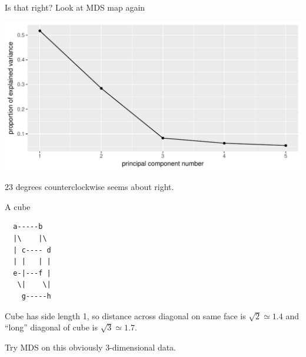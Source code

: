 \begin{frame}[fragile]{Is that right? Look at MDS map again}
  
\begin{knitrout}
\color{fgcolor}\begin{kframe}
\begin{alltt}
\end{alltt}
\end{kframe}
\includegraphics[width=\maxwidth]{figure/unnamed-chunk-25-1} 

\end{knitrout}

23 degrees counterclockwise seems about right.
  
\end{frame}

\begin{frame}[fragile]{A cube}
  
  
\begin{verbatim}
  a-----b
  |\    |\
  | c---- d
  | |   | |
  e-|---f |
   \|    \|
    g-----h
\end{verbatim}

Cube has side length 1, so distance across diagonal on same face is $\sqrt{2}\simeq 1.4$ and ``long'' diagonal of cube is $\sqrt{3}\simeq 1.7$. 
  
\vspace{3ex}

Try MDS on this obviously 3-dimensional data.

\end{frame}

